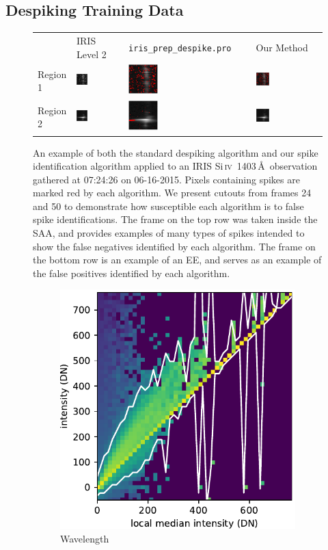 \documentclass[10pt,letterpaper, doublespace]{article}
\newcommand{\SiIV}{Si\,\textsc{iv}~1403\,\AA}
\newcommand{\tilewidth}{0.25\textwidth}
\newcommand{\EE}{\ac{EE}}
\newcommand{\SAA}{\ac{SAA}}
\begin{document}
		\subsection{Despiking Training Data}	\label{sec_dspk}	
			
			\begin{figure}[b!]
	
				\renewcommand{\arraystretch}{0}
				\setlength{\tabcolsep}{0pt}
				\begin{tabular}{m{} m{\tilewidth} m{\tilewidth} m{\tilewidth} @{}m{0pt}@{}}
					& \centering IRIS Level 2 & \centering \texttt{iris\_prep\_despike.pro} & \centering Our Method & \\[5mm]
					Region 1 & \includegraphics[width=\tilewidth]{fig/orig_1} & \includegraphics[width=\tilewidth]{fig/despike_1} & \includegraphics[width=\tilewidth]{fig/dspk_1} & \\
					Region 2 & \includegraphics[width=\tilewidth]{fig/orig_2} & \includegraphics[width=\tilewidth]{fig/despike_2} & \includegraphics[width=\tilewidth]{fig/dspk_2} & \\
				\end{tabular}
				
				\caption{An example of both the standard despiking algorithm and our spike identification algorithm applied to an IRIS \SiIV\ observation gathered at 07:24:26 on 06-16-2015.
					Pixels containing spikes are marked red by each algorithm.
					We present cutouts from frames 24 and 50 to demonstrate how susceptible each algorithm is to false spike identifications. 
					The frame on the top row was taken inside the \SAA, and provides examples of many types of spikes intended to show the false negatives identified by each algorithm.
					The frame on the bottom row is an example of an \EE, and serves as an example of the false positives identified by each algorithm.}
				
				\label{dspk_ex}
				
			\end{figure}
			
			\begin{figure}[t!]
				\centering
				\begin{subfigure}[t]{0.288\textwidth}
					\centering
					\includegraphics[width=\textwidth]{fig/hist_0}
					\caption{Wavelength}
				\end{subfigure}
				~ 
				\begin{subfigure}[t]{0.288\textwidth}
					\centeri
\end{subfigure}
\end{figure}
\end{document}
